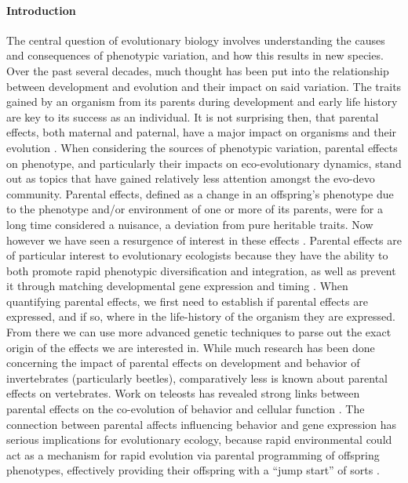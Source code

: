 \documentclass[12pt]{extarticle}
\begin{document}
\paragraph{Introduction}
The central question of evolutionary biology involves understanding the causes and consequences of phenotypic variation, and how this results in new species. Over the past several decades, much thought has been put into the relationship between development and evolution and their impact on said variation.
The traits gained by an organism from its parents during development and early life history are key to its success as an individual. It is not surprising then, that parental effects, both maternal and paternal, have a major impact on organisms and their evolution \citep{charmantier_garant_kruuk_2014, Danchin2011, Badyaev2009}. When considering the sources of phenotypic variation, parental effects on phenotype, and particularly their impacts on eco-evolutionary dynamics, stand out as topics that have gained relatively less attention amongst the evo-devo community. Parental effects, defined as a change in an offspring's phenotype due to the phenotype and/or environment of one or more of its parents, were for a long time considered a nuisance, a deviation from pure heritable traits. Now however we have seen a resurgence of interest in these effects \citep{charmantier_garant_kruuk_2014}.
Parental effects are of particular interest to evolutionary ecologists because they have the ability to both promote rapid phenotypic diversification and integration, as well as prevent it through matching developmental gene expression and timing \citep{Badyaev2009}. When quantifying parental effects, we first need to establish if parental effects are expressed, and if so, where in the life-history of the organism they are expressed. From there we can use more advanced genetic techniques to parse out the exact origin of the effects we are interested in. While much research has been done concerning the impact of parental effects on development \citep{Tigreros2021} and behavior of invertebrates (particularly beetles), comparatively less is known about parental effects on vertebrates. Work on teleosts has revealed strong links between parental effects on the co-evolution of behavior and cellular function \citep{Yoshizawa2012}. The connection between parental affects influencing behavior and gene expression has serious implications for evolutionary ecology, because rapid environmental could act as a mechanism for rapid evolution via parental programming of offspring phenotypes, effectively providing their offspring with a ``jump start'' of sorts \citep{Danchin2011, Donelson2018}. 
\end{document}
